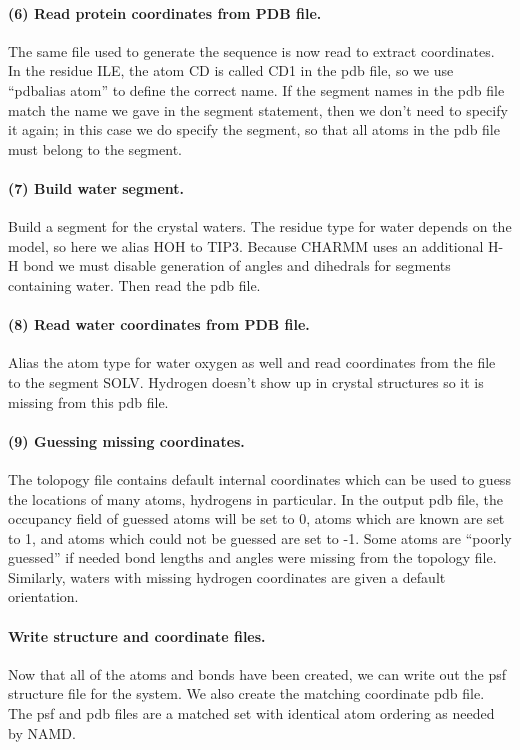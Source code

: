 \paragraph*{(6) Read protein coordinates from PDB file.}
The same file used to generate the sequence is now read to extract
coordinates.  In the residue ILE, the atom CD is called CD1 in the
pdb file, so we use ``pdbalias atom'' to define the correct name.  If the
segment names in the pdb file match the name we gave in the segment
statement, then we don't need to specify it again; in this case we
do specify the segment, so that all atoms in the pdb file must belong
to the segment.

\paragraph*{(7) Build water segment.}
Build a segment for the crystal waters.  The residue type for water
depends on the model, so here we alias HOH to TIP3.  Because CHARMM
uses an additional H-H bond we must disable generation of angles and
dihedrals for segments containing water.  Then read the pdb file.

\paragraph*{(8) Read water coordinates from PDB file.}
Alias the atom type for water oxygen as well and read coordinates from
the file to the segment SOLV.  Hydrogen doesn't show up in crystal
structures so it is missing from this pdb file.

\paragraph*{(9) Guessing missing coordinates.}
The tolopogy file contains default internal coordinates which can be
used to guess the locations of many atoms, hydrogens in particular.
In the output pdb file, the occupancy field of guessed atoms will be
set to 0, atoms which are known are set to 1, and atoms which could
not be guessed are set to -1.  Some atoms are ``poorly guessed'' if
needed bond lengths and angles were missing from the topology file.
Similarly, waters with missing hydrogen coordinates are given a
default orientation.

\paragraph*{Write structure and coordinate files.}
Now that all of the atoms and bonds have been created, we can write
out the psf structure file for the system.
We also create the matching coordinate pdb file.  The psf and pdb files
are a matched set with identical atom ordering as needed by NAMD.


